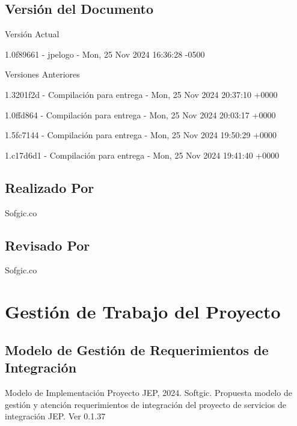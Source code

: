 \documentclass[
  paper=a4,
  ,captions=tableheading
]{scrartcl}
\renewenvironment{quote}{\begin{customblockquote}\list{}{\rightmargin=0em\leftmargin=0em}%
\item\relax\color{blockquote-text}\ignorespaces}{\unskip\unskip\endlist\end{customblockquote}}
\begin{document}
\subsection{Versión del Documento}\label{sec:versiuxf3n-del-documento}

\begin{quote}
\end{quote}

Versión Actual

1.0f89661 - jpelogo - Mon, 25 Nov 2024 16:36:28 -0500

Versiones Anteriores

1.3201f2d - Compilación para entrega - Mon, 25 Nov 2024 20:37:10 +0000

1.0ffd864 - Compilación para entrega - Mon, 25 Nov 2024 20:03:17 +0000

1.5fc7144 - Compilación para entrega - Mon, 25 Nov 2024 19:50:29 +0000

1.c17d6d1 - Compilación para entrega - Mon, 25 Nov 2024 19:41:40 +0000

\subsection{Realizado Por}\label{sec:realizado-por}

Sofgic.co

\subsection{Revisado Por}\label{sec:revisado-por}

Sofgic.co

\newpage

\section{Gestión de Trabajo del
Proyecto}\label{sec:gestiuxf3n-de-trabajo-del-proyecto}

\subsection{Modelo de Gestión de Requerimientos de
Integración}\label{sec:modelo-de-gestiuxf3n-de-requerimientos-de-integraciuxf3n}

\begin{quote}
Modelo de Implementación Proyecto JEP, 2024. Softgic. Propuesta modelo
de gestión y atención requerimientos de integración del proyecto de
servicios de integración JEP. Ver 0.1.37
\end{quote}
\end{document}
